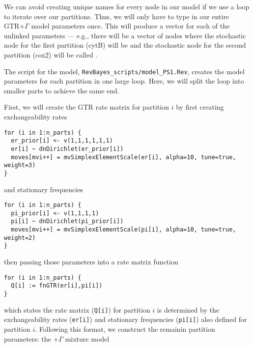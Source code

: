 We can avoid creating unique names for every node in our model if we use a  loop to iterate over our partitions. Thus, we will only have to type in our entire GTR+$\Gamma$ model parameters once. 
This will produce a vector for each of the unlinked parameters --- e.g., there will be a vector of  nodes where the stochastic node for the first partition (cytB) will be  and the stochastic node for the second partition (cox2) will be called .

The script for the model, {\tt RevBayes\_scripts/model\_PS1.Rev}, creates the model parameters for each partition in one large loop.
Here, we will split the loop into smaller parts to achieve the same end.

First, we will create the GTR rate matrix for partition $i$ by first creating exchangeability rates
{\tt \small \begin{snugshade*}
\begin{lstlisting}
for (i in 1:n_parts) {
  er_prior[i] <- v(1,1,1,1,1,1)
  er[i] ~ dnDirichlet(er_prior[i])
  moves[mvi++] = mvSimplexElementScale(er[i], alpha=10, tune=true, weight=3) 
}
\end{lstlisting}
\end{snugshade*}}

and stationary frequencies

{\tt \small \begin{snugshade*}
\begin{lstlisting}
for (i in 1:n_parts) {
  pi_prior[i] <- v(1,1,1,1)
  pi[i] ~ dnDirichlet(pi_prior[i])
  moves[mvi++] = mvSimplexElementScale(pi[i], alpha=10, tune=true, weight=2)
}
\end{lstlisting}
\end{snugshade*}}

then passing those parameters into a rate matrix function

{\tt \small \begin{snugshade*}
\begin{lstlisting}
for (i in 1:n_parts) {
  Q[i] := fnGTR(er[i],pi[i]) 
}
\end{lstlisting}
\end{snugshade*}}

which states the rate matrix ({\tt Q[i]}) for partition $i$ is determined by the exchangeability rates ({\tt er[i]}) and stationary frequencies ({\tt pi[i]}) also defined for partition $i$.
Following this format, we construct the remainin partition parameters: the $+\Gamma$ mixture model

